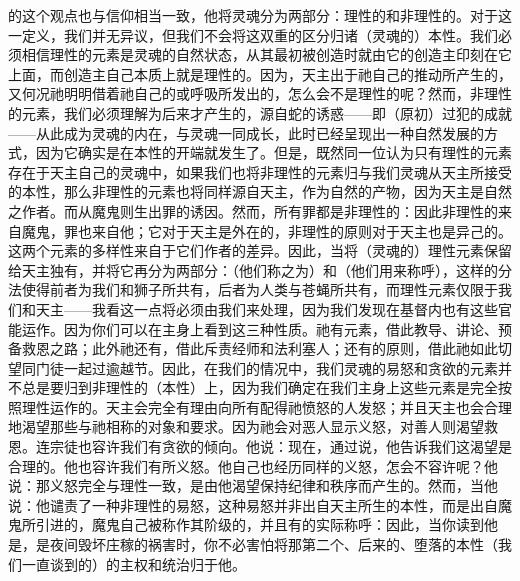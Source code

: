 的这个观点也与信仰相当一致，他将灵魂分为两部分：理性的和非理性的。对于这一定义，我们并无异议，但我们不会将这双重的区分归诸（灵魂的）本性。我们必须相信理性的元素是灵魂的自然状态，从其最初被创造时就由它的创造主印刻在它上面，而创造主自己本质上就是理性的。因为，天主出于祂自己的推动所产生的，又何况祂明明借着祂自己的或呼吸所发出的，怎么会不是理性的呢？然而，非理性的元素，我们必须理解为后来才产生的，源自蛇的诱惑——即（原初）过犯的成就——从此成为灵魂的内在，与灵魂一同成长，此时已经呈现出一种自然发展的方式，因为它确实是在本性的开端就发生了。但是，既然同一位认为只有理性的元素存在于天主自己的灵魂中，如果我们也将非理性的元素归与我们灵魂从天主所接受的本性，那么非理性的元素也将同样源自天主，作为自然的产物，因为天主是自然之作者。而从魔鬼则生出罪的诱因。然而，所有罪都是非理性的：因此非理性的来自魔鬼，罪也来自他；它对于天主是外在的，非理性的原则对于天主也是异己的。这两个元素的多样性来自于它们作者的差异。因此，当将（灵魂的）理性元素保留给天主独有，并将它再分为两部分：（他们称之为）和（他们用来称呼），这样的分法使得前者为我们和狮子所共有，后者为人类与苍蝇所共有，而理性元素仅限于我们和天主——我看这一点将必须由我们来处理，因为我们发现在基督内也有这些官能运作。因为你们可以在主身上看到这三种性质。祂有元素，借此教导、讲论、预备救恩之路；此外祂还有，借此斥责经师和法利塞人；还有的原则，借此祂如此切望同门徒一起过逾越节。因此，在我们的情况中，我们灵魂的易怒和贪欲的元素并不总是要归到非理性的（本性）上，因为我们确定在我们主身上这些元素是完全按照理性运作的。天主会完全有理由向所有配得祂愤怒的人发怒；并且天主也会合理地渴望那些与祂相称的对象和要求。因为祂会对恶人显示义怒，对善人则渴望救恩。连宗徒也容许我们有贪欲的倾向。他说：现在，通过说，他告诉我们这渴望是合理的。他也容许我们有所义怒。他自己也经历同样的义怒，怎会不容许呢？他说：那义怒完全与理性一致，是由他渴望保持纪律和秩序而产生的。然而，当他说：他谴责了一种非理性的易怒，这种易怒并非出自天主所生的本性，而是出自魔鬼所引进的，魔鬼自己被称作其阶级的，并且有的实际称呼：因此，当你读到他是，是夜间毁坏庄稼的祸害时，你不必害怕将那第二个、后来的、堕落的本性（我们一直谈到的）的主权和统治归于他。\par

